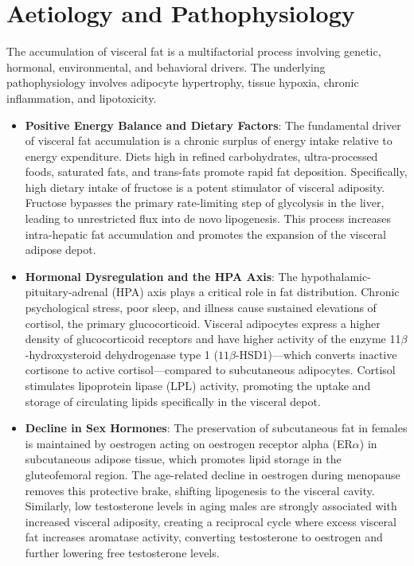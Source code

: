 \section*{Aetiology and Pathophysiology}
The accumulation of visceral fat is a multifactorial process involving genetic, hormonal, environmental, and behavioral drivers. The underlying pathophysiology involves adipocyte hypertrophy, tissue hypoxia, chronic inflammation, and lipotoxicity.

\begin{itemize}
    \item \textbf{Positive Energy Balance and Dietary Factors}: The fundamental driver of visceral fat accumulation is a chronic surplus of energy intake relative to energy expenditure. Diets high in refined carbohydrates, ultra-processed foods, saturated fats, and trans-fats promote rapid fat deposition. Specifically, high dietary intake of fructose is a potent stimulator of visceral adiposity. Fructose bypasses the primary rate-limiting step of glycolysis in the liver, leading to unrestricted flux into de novo lipogenesis. This process increases intra-hepatic fat accumulation and promotes the expansion of the visceral adipose depot.
    \item \textbf{Hormonal Dysregulation and the HPA Axis}: The hypothalamic-pituitary-adrenal (HPA) axis plays a critical role in fat distribution. Chronic psychological stress, poor sleep, and illness cause sustained elevations of cortisol, the primary glucocorticoid. Visceral adipocytes express a higher density of glucocorticoid receptors and have higher activity of the enzyme 11$\beta$-hydroxysteroid dehydrogenase type 1 ($11\beta$-HSD1)—which converts inactive cortisone to active cortisol—compared to subcutaneous adipocytes. Cortisol stimulates lipoprotein lipase (LPL) activity, promoting the uptake and storage of circulating lipids specifically in the visceral depot.
    \item \textbf{Decline in Sex Hormones}: The preservation of subcutaneous fat in females is maintained by oestrogen acting on oestrogen receptor alpha (ER$\alpha$) in subcutaneous adipose tissue, which promotes lipid storage in the gluteofemoral region. The age-related decline in oestrogen during menopause removes this protective brake, shifting lipogenesis to the visceral cavity. Similarly, low testosterone levels in aging males are strongly associated with increased visceral adiposity, creating a reciprocal cycle where excess visceral fat increases aromatase activity, converting testosterone to oestrogen and further lowering free testosterone levels.

\end{itemize}
